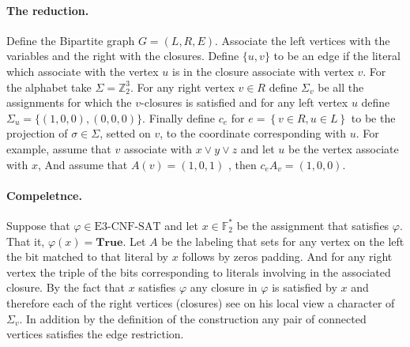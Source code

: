 \documentclass{article}
\begin{document}
\paragraph{The reduction.} Define the Bipartite graph $G = (L,R,E)$. Associate the left vertices with the variables and the right with the closures. Define $\{u,v\}$ to be an edge if the literal which associate with the vertex $u$ is in the closure associate with vertex $v$. For the alphabet take $\Sigma = \mathbb{Z}_{2}^3$. For any right vertex $v\in R$ define $\Sigma_{v}$ be all the assignments for which the $v$-closures is satisfied and for any left vertex $u$ define $\Sigma_{u} = \{ \left( 1 , 0 , 0 \right), \left( 0 , 0, 0 \right) \}$. Finally define $c_{e}$ for $ e = \left\{ v \in R, u \in L \right\}$ to be the projection of $\sigma \in \Sigma$, setted on $v$, to the coordinate corresponding with $u$. For example, assume that $v$ associate with $x\vee y \vee z $ and let $u$ be the vertex associate with $x$, And assume that $A(v) = (1,0,1)$ , then $c_{e}A_{v} = (1,0,0)$.           


%

\paragraph{Compeletnce. } Suppose that $\varphi \in \text{E3-CNF-SAT}$ and let $x \in \mathbb{F}_{2}^{*}$ be the assignment that satisfies $\varphi$. That it, $\varphi\left( x \right) = \mathbf{True}$. Let $A$ be the labeling that sets for any vertex on the left the bit matched to that literal by $x$ follows by zeros padding. And for any right vertex the triple of the bits corresponding to literals involving in the associated closure. By the fact that $x$ satisfies $\varphi$ any closure in $\varphi$ is satisfied by $x$ and therefore each of the right vertices (closures) see on his local view a character of $\Sigma_{v}$. In addition by the definition of the construction any pair of connected vertices satisfies the edge restriction. 
\end{document}
